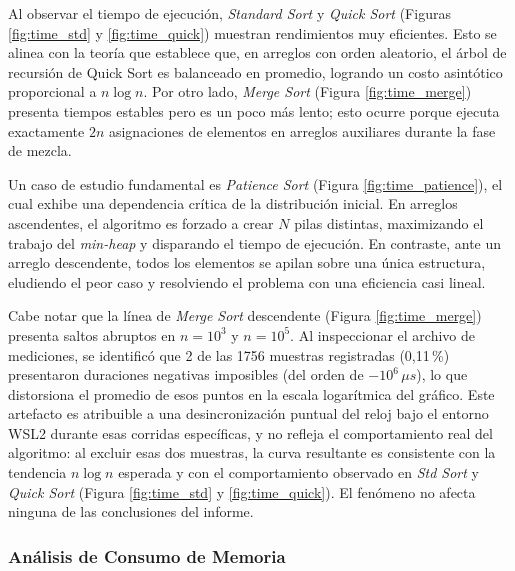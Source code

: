 Al observar el tiempo de ejecución, \textit{Standard Sort} y \textit{Quick Sort} (Figuras \ref{fig:time_std} y \ref{fig:time_quick}) muestran rendimientos muy eficientes. Esto se alinea con la teoría que establece que, en arreglos con orden aleatorio, el árbol de recursión de Quick Sort es balanceado en promedio, logrando un costo asintótico proporcional a $n \log n$. Por otro lado, \textit{Merge Sort} (Figura \ref{fig:time_merge}) presenta tiempos estables pero es un poco más lento; esto ocurre porque ejecuta exactamente $2n$ asignaciones de elementos en arreglos auxiliares durante la fase de mezcla. 

Un caso de estudio fundamental es \textit{Patience Sort} (Figura \ref{fig:time_patience}), el cual exhibe una dependencia crítica de la distribución inicial. En arreglos ascendentes, el algoritmo es forzado a crear $N$ pilas distintas, maximizando el trabajo del \textit{min-heap} y disparando el tiempo de ejecución. En contraste, ante un arreglo descendente, todos los elementos se apilan sobre una única estructura, eludiendo el peor caso y resolviendo el problema con una eficiencia casi lineal.

Cabe notar que la línea de \textit{Merge Sort} descendente (Figura \ref{fig:time_merge}) presenta saltos abruptos en $n = 10^3$ y $n = 10^5$. Al inspeccionar el archivo de mediciones, se identificó que 2 de las 1756 muestras registradas
(0,11\,\%) presentaron duraciones negativas imposibles (del orden de $-10^6\,\mu s$), lo que distorsiona el promedio de esos puntos en la escala logarítmica del gráfico. Este artefacto es atribuible a una desincronización puntual del reloj bajo el entorno WSL2 durante esas corridas específicas, y no refleja el comportamiento real del algoritmo: al excluir esas dos muestras, la curva resultante es consistente con la tendencia $n \log n$ esperada y con el comportamiento observado en \textit{Std Sort} y \textit{Quick Sort} (Figura \ref{fig:time_std} y \ref{fig:time_quick}). El fenómeno no afecta ninguna de las conclusiones del informe.

\subsubsection{Análisis de Consumo de Memoria}

